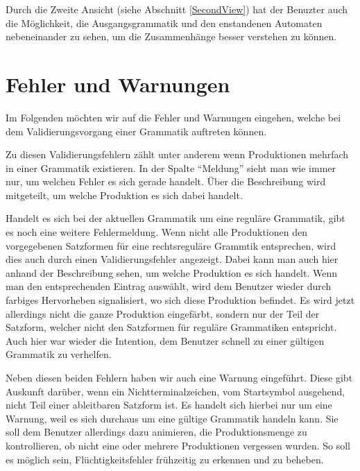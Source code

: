 Durch die Zweite Ansicht (siehe Abschnitt \ref{SecondView}) hat der Benuzter
auch die Möglichkeit, die Ausgangsgrammatik und den enstandenen Automaten
nebeneinander zu sehen, um die Zusammenhänge besser verstehen zu können.\vspace{10pt}


\section{Fehler und Warnungen}\label{InteractionGrammar}

Im Folgenden möchten wir auf die Fehler und Warnungen eingehen, welche bei dem
Validierungsvorgang einer Grammatik auftreten können.\vspace{10pt}

Zu diesen Validierungsfehlern zählt unter anderem wenn Produktionen mehrfach
in einer Grammatik existieren. In der Spalte "`Meldung"' sieht man wie immer
nur, um welchen Fehler es sich gerade handelt. Über die Beschreibung wird
mitgeteilt, um welche Produktion es sich dabei handelt.\vspace{10pt}

Handelt es sich bei der aktuellen Grammatik um eine reguläre Grammatik, gibt es
noch eine weitere Fehlermeldung. Wenn nicht alle Produktionen den vorgegebenen
Satzformen für eine rechtsreguläre Grammtik entsprechen, wird dies auch durch
einen Validierungsfehler angezeigt. Dabei kann man auch hier anhand der
Beschreibung sehen, um welche Produktion es sich handelt. Wenn man den
entsprechenden Eintrag auswählt, wird dem Benutzer wieder durch farbiges
Hervorheben signalisiert, wo sich diese Produktion befindet. Es wird jetzt
allerdings nicht die ganze Produktion eingefärbt, sondern nur der Teil der
Satzform, welcher nicht den Satzformen für reguläre Grammatiken entspricht. Auch
hier war wieder die Intention, dem Benutzer schnell zu einer gültigen Grammatik
zu verhelfen.\vspace{10pt}

Neben diesen beiden Fehlern haben wir auch eine Warnung eingeführt. Diese gibt
Auskunft darüber, wenn ein Nichtterminalzeichen, vom Startsymbol ausgehend, nicht
Teil einer ableitbaren Satzform ist. Es handelt sich hierbei nur um eine Warnung,
weil es sich durchaus um eine gültige Grammatik handeln kann. Sie soll dem
Benutzer allerdings dazu animieren, die Produktionsmenge zu kontrollieren, ob
nicht eine oder mehrere Produktionen vergessen wurden. So soll es möglich sein,
Flüchtig\-keits\-fehler frühzeitig zu erkennen und zu beheben.\vspace{10pt}


